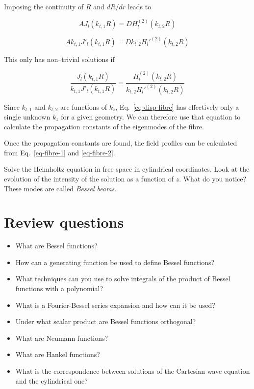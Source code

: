 Imposing the continuity of $R$ and $d R / dr$ leads to

\begin{equation}
A J_l\left(k_{t,1}R\right) = D H_l^{(2)}\left(k_{t,2}R\right)
\end{equation} 

\begin{equation}
A k_{t,1} J'_l\left(k_{t,1}R\right) = D k_{t,2} H_l'^{(2)}\left(k_{t,2}R\right)
\end{equation} 

This only has non--trivial solutions if

\begin{equation}
\frac{J_l\left(k_{t,1}R\right)}{k_{t,1} J'_l\left(k_{t,1}R\right)} = \frac{H_l^{(2)}\left(k_{t,2}R\right)}{k_{t,2} H_l'^{(2)}\left(k_{t,2}R\right)} \label{eq-disp-fibre}
\end{equation}

Since $k_{t,1}$ and $k_{t,2}$ are functions of $k_z$, Eq.~\ref{eq-disp-fibre} has effectively only a single unknown $k_z$ for a given geometry. We can therefore use that equation to calculate the propagation constants of the eigenmodes of the fibre.

Once the propagation constants are found, the field profiles can be calculated from Eq.~\ref{eq-fibre-1} and \ref{eq-fibre-2}.


\begin{exer}
Solve the Helmholtz equation in free space in cylindrical coordinates. Look at the evolution of the intensity of the solution as a function of $z$. What do you notice? These modes are called \emph{Bessel beams}.
\end{exer}



\section*{Review questions}

\begin{itemize}
\item What are Bessel functions?  
\item How can a generating function be used to define Bessel functions?
\item What techniques can you use to solve integrals of the product of Bessel functions with a polynomial?
\item What is a Fourier-Bessel series expansion and how can it be used?
\item Under what scalar product are Bessel functions orthogonal?
\item What are Neumann functions?
\item What are Hankel functions?
\item What is the correspondence between solutions of the Cartesian wave equation and the cylindrical one?   
\end{itemize}

